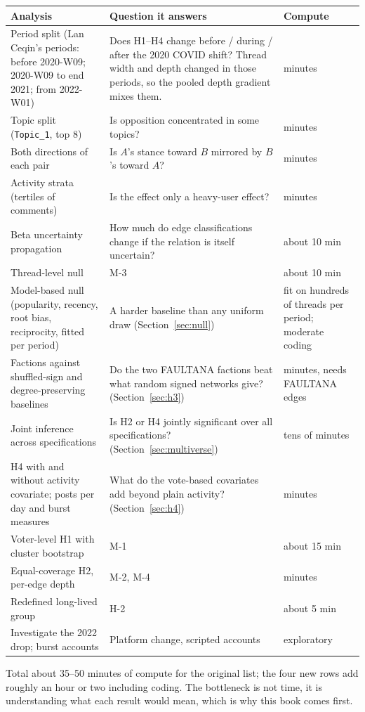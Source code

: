 \begin{longtable}{@{}p{4cm} p{7cm} p{2.4cm}@{}}
\toprule
Analysis & Question it answers & Compute \\
\midrule
\endhead
Period split (Lan Ceqin's periods: before 2020-W09; 2020-W09 to end 2021; from 2022-W01) & Does H1--H4 change before / during / after the 2020 COVID shift? Thread width and depth changed in those periods, so the pooled depth gradient mixes them. & minutes \\
Topic split (\texttt{Topic\_1}, top 8) & Is opposition concentrated in some topics? & minutes \\
Both directions of each pair & Is $A$'s stance toward $B$ mirrored by $B$'s toward $A$? & minutes \\
Activity strata (tertiles of comments) & Is the effect only a heavy-user effect? & minutes \\
Beta uncertainty propagation & How much do edge classifications change if the relation is itself uncertain? & about 10 min \\
Thread-level null & M-3 & about 10 min \\
Model-based null (popularity, recency, root bias, reciprocity, fitted per period) & A harder baseline than any uniform draw (Section~\ref{sec:null}) & fit on hundreds of threads per period; moderate coding \\
Factions against shuffled-sign and degree-preserving baselines & Do the two FAULTANA factions beat what random signed networks give? (Section~\ref{sec:h3}) & minutes, needs FAULTANA edges \\
Joint inference across specifications & Is H2 or H4 jointly significant over all specifications? (Section~\ref{sec:multiverse}) & tens of minutes \\
H4 with and without activity covariate; posts per day and burst measures & What do the vote-based covariates add beyond plain activity? (Section~\ref{sec:h4}) & minutes \\
Voter-level H1 with cluster bootstrap & M-1 & about 15 min \\
Equal-coverage H2, per-edge depth & M-2, M-4 & minutes \\
Redefined long-lived group & H-2 & about 5 min \\
Investigate the 2022 drop; burst accounts & Platform change, scripted accounts & exploratory \\
\bottomrule
\end{longtable}
Total about 35--50 minutes of compute for the original list; the four new rows add roughly an hour or two including coding. The bottleneck is not time, it is understanding what each result would mean, which is why this book comes first.

